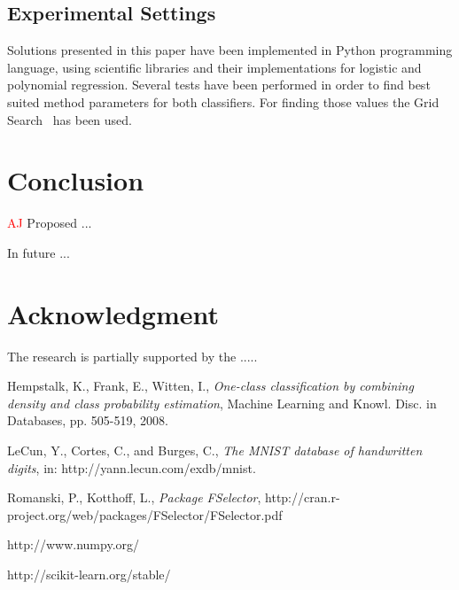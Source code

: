 \documentclass{llncs}
\begin{document}
\subsection{Experimental Settings}
\vspace{-3pt}

Solutions presented in this paper have been implemented in Python programming language, using scientific libraries \cite{NumPy,Scikit} and their implementations for logistic and polynomial regression. Several tests have been performed in order to find best suited method parameters for both classifiers. For finding those values the Grid Search~\cite{Scikit} has been used.


\section{Conclusion}
  \label{Conclusion}

\textcolor{red} {AJ}
Proposed ...

In future ...


\section*{Acknowledgment}

\noindent The research is partially supported by the .....

\begin{thebibliography}{1}

Hempstalk, K., Frank, E., Witten, I., \emph{One-class classification by combining density and class probability estimation}, Machine Learning and Knowl. Disc. in Databases, pp. 505-519, 2008.

LeCun, Y., Cortes, C., and Burges, C., \emph{The MNIST database of handwritten digits}, in: http://yann.lecun.com/exdb/mnist.

Romanski, P., Kotthoff, L., \emph{Package FSelector}, http://cran.r-project.org/web/packages/FSelector/FSelector.pdf

http://www.numpy.org/

http://scikit-learn.org/stable/

\end{thebibliography}
\end{document}
